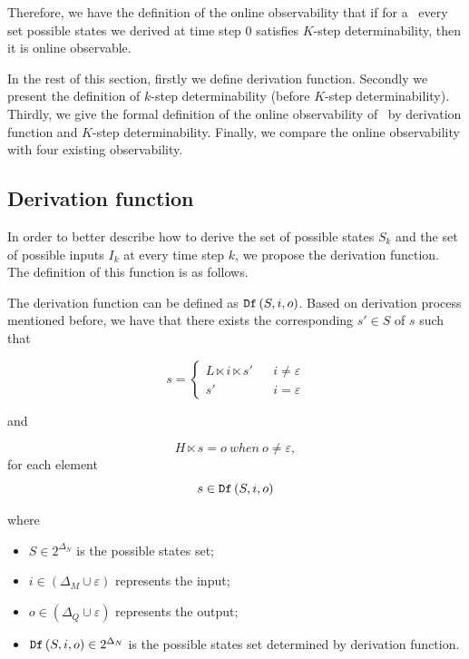 Therefore, we have the definition of the online observability that if for a \BCN\ every set possible states we derived at time step $0$ satisfies $K$-step determinability, then it is online observable.

 In the rest of this section, firstly we define derivation function. Secondly we present the definition of $k$-step determinability (before $K$-step determinability). Thirdly, we give the formal definition of the online observability of \BCNs\ by derivation function and $K$-step determinability. Finally, we compare the online observability with four existing observability.
\subsection{Derivation function}

 
In order to better describe how to derive the set of possible states $S_k$ and the set of possible inputs $I_k$ at every time step $k$, we propose the derivation function. The definition of this function is as follows.
\begin{definition} The derivation function can be defined as ${\tt Df}\left(S, i, o\right)$. Based on derivation process mentioned before, 
	we have that there exists the corresponding $s'\in S$ of $s$ such that 

\[s=\left\{
\begin{array}{rcl}
L\ltimes i\ltimes s'      &      & {i\neq \varepsilon}\\
s'       &      & {i= \varepsilon}
\end{array} \right. \]

and 

\[H\ltimes s=o\ when\ o\neq \varepsilon, \]
for each element \[s\in {\tt Df}\left(S, i, o\right)\]
\end{definition}
where   
\begin{itemize}
  \item $S\in 2^{\Delta_N}$ is the possible states set;
  \item $i\in (\Delta_M\cup\varepsilon)$ represents the input;
  \item $o\in(\Delta_Q\cup\varepsilon)$ represents the output; 
  \item ${\tt Df}\left(S, i, o\right)\in 2^{\Delta_N}$ is the possible states set determined by derivation function.
\end{itemize} 

